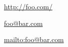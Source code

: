 
\def\mytitle{Automatic Links}


\href{http://foo.com/}{http://foo.com/}

\href{mailto:foo@bar.com}{foo@bar.com}

\href{mailto:foo@bar.com}{mailto:foo@bar.com}



